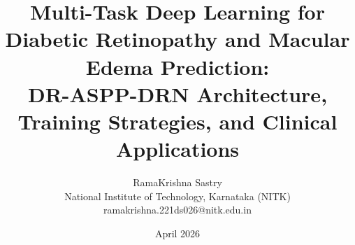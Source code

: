 \documentclass[12pt,a4paper]{article}
\begin{document}
\title{\textbf{Multi-Task Deep Learning for Diabetic Retinopathy and Macular Edema Prediction: \\
\large DR-ASPP-DRN Architecture, Training Strategies, and Clinical Applications}}
\author{RamaKrishna Sastry \\ 
\small National Institute of Technology, Karnataka (NITK) \\
\small ramakrishna.221ds026@nitk.edu.in}
\date{April 2026}

\maketitle

\newpage
\tableofcontents
\newpage
\end{document}
